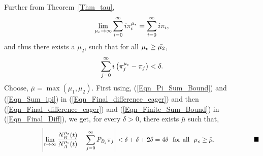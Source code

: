 Further from Theorem~\ref{Thm_tau},  
	$$
	\lim_{{\mu_\epsilon} \to \infty } \sum_{i = 0}^\infty i {\pi}_i^{\mu_\epsilon} 
	 = \sum_{i = 0}^\infty i {\pi}_i,
	$$ and thus   there exists a $\bar{\mu_2}$, such that for all ${\mu_\epsilon} \geq \bar{\mu_2}$,
	\begin{eqnarray}
	\label{Eqn_Sum_ipi}
	\sum_{j = 0}^\infty i \left( {\pi}_j^{\mu_\epsilon} - {\pi}_j \right) < \delta.  
	\end{eqnarray}
	Choose, $\bar{\mu} = \max \left(\mu_1, \mu_2\right)$. First using, (\ref{Eqn_Pi_Sum_Bound}) and (\ref{Eqn_Sum_ipi}) in (\ref{Eqn_Final_difference_eager}) and then  (\ref{Eqn_Final_difference_eager}) and (\ref{Eqn_Finite_Sum_Bound}) in (\ref{Eqn_Final_Diff}), we get, for every $\delta > 0 $, there exists $\bar{\mu}$ such that,
	\begin{eqnarray*}
		\hspace{20mm}
		\left| \lim\limits_{t \to \infty } \frac{N_B^\mue (t)}{N_A^\mue (t)} - \sum_{j = 0}^{\infty} P_{B_j} {\pi}_j \right| < \delta + \delta + 2 \delta = 4 \delta \ \ \mbox{for all} \ \ \mue \geq \bar{\mu}.
		\hspace{20mm}  \mbox{ \eop}
	\end{eqnarray*}
